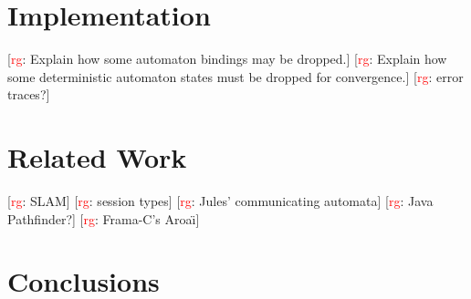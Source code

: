 \documentclass[a4paper]{article}
\newcommand{\todo}[2]{{\small [\textcolor{red}{#1}: #2]}}
\newcommand{\rg}[1]{\todo{rg}{#1}}
\theoremstyle{remark}
\begin{document}
\section{Implementation} %

\rg{Explain how some automaton bindings may be dropped.}
\rg{Explain how some deterministic automaton states must be dropped for convergence.}
\rg{error traces?}

\section{Related Work} %

\rg{SLAM}
\rg{session types}
\rg{Jules' communicating automata}
\rg{Java Pathfinder?}
\rg{Frama-C's Aroa\"\i}

\section{Conclusions} %



\end{document}
